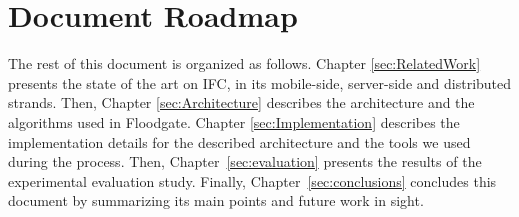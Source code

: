   
  
\section{Document Roadmap}
  
The rest of this document is organized as follows. Chapter \ref{sec:RelatedWork} presents the state of the art on IFC, in its mobile-side, server-side and distributed strands. Then, Chapter \ref{sec:Architecture} describes the
architecture and the algorithms used in Floodgate. Chapter \ref{sec:Implementation} describes the implementation details for the described architecture and the tools we used during the process. Then, Chapter~\ref{sec:evaluation} presents the results of the experimental evaluation study. Finally, Chapter~\ref{sec:conclusions} concludes this document by summarizing its main points and future work in sight.
 